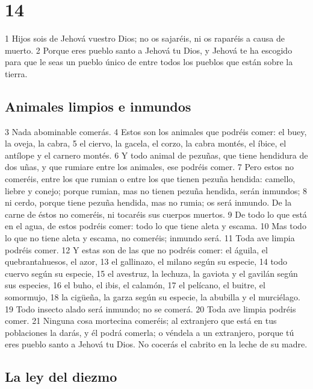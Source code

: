 \chapter{14}


1 Hijos sois de Jehová vuestro Dios; no os sajaréis, ni os raparéis a causa de muerto. 
2 Porque eres pueblo santo a Jehová tu Dios, y Jehová te ha escogido para que le seas un pueblo único de entre todos los pueblos que están sobre la tierra.

\section{Animales limpios e inmundos}


3 Nada abominable comerás.
4 Estos son los animales que podréis comer: el buey, la oveja, la cabra,
5 el ciervo, la gacela, el corzo, la cabra montés, el íbice, el antílope y el carnero montés.
6 Y todo animal de pezuñas, que tiene hendidura de dos uñas, y que rumiare entre los animales, ese podréis comer.
7 Pero estos no comeréis, entre los que rumian o entre los que tienen pezuña hendida: camello, liebre y conejo; porque rumian, mas no tienen pezuña hendida, serán inmundos;
8 ni cerdo, porque tiene pezuña hendida, mas no rumia; os será inmundo. De la carne de éstos no comeréis, ni tocaréis sus cuerpos muertos.
9 De todo lo que está en el agua, de estos podréis comer: todo lo que tiene aleta y escama.
10 Mas todo lo que no tiene aleta y escama, no comeréis; inmundo será.
11 Toda ave limpia podréis comer.
12 Y estas son de las que no podréis comer: el águila, el quebrantahuesos, el azor,
13 el gallinazo, el milano según su especie,
14 todo cuervo según su especie,
15 el avestruz, la lechuza, la gaviota y el gavilán según sus especies, 
16 el buho, el ibis, el calamón,
17 el pelícano, el buitre, el somormujo,
18 la cigüeña, la garza según su especie, la abubilla y el murciélago.
19 Todo insecto alado será inmundo; no se comerá.
20 Toda ave limpia podréis comer.
21 Ninguna cosa mortecina comeréis; al extranjero que está en tus poblaciones la darás, y él podrá comerla; o véndela a un extranjero, porque tú eres pueblo santo a Jehová tu Dios. No cocerás el cabrito en la leche de su madre.

\section{La ley del diezmo}

